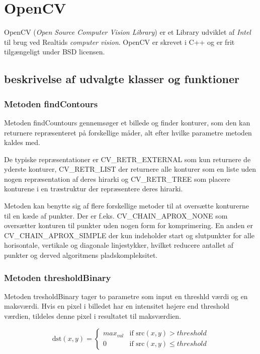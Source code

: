 \section{OpenCV}
OpenCV (\emph{Open Source Computer Vision Library}) er et Library udviklet af \emph{Intel}
til brug ved Realtids \emph{computer vision}.
OpenCV er skrevet i C++ og er frit tilgængeligt under BSD licensen.

\subsection{beskrivelse af udvalgte klasser og funktioner}

\subsubsection{Metoden findContours}
Metoden findCountours gennemsøger et billede og finder konturer, som den kan returnere 
repræsenteret på forskellige måder, alt efter hvilke parametre metoden kaldes med.

De typiske repræsentationer er CV\_RETR\_EXTERNAL som kun returnere de yderste konturer,
CV\_RETR\_LIST der returnere alle konturer som en liste uden nogen repræsentation af deres hirarki og
CV\_RETR\_TREE som placere konturene i en træstruktur der repræsentere deres hirarki.

Metoden kan benytte sig af flere forskellige metoder til at oversætte konturerne til en kæde af punkter. 
Der er f.eks. CV\_CHAIN\_APROX\_NONE som oversætter konturen til punkter uden nogen form for komprimering.
En anden er CV\_CHAIN\_APROX\_SIMPLE der kun indeholder start og slutpunkter for alle horisontale,
vertikale og diagonale linjestykker, hvilket reducere antallet af punkter og derved algoritmens
pladskompleksitet.
\cite{EmguCVLibDoc}

\subsubsection{Metoden thresholdBinary}
Metoden tresholdBinary tager to parametre som input en threshld værdi og en maksværdi.
Hvis en pixel i billedet har en intensitet højere end threshold værdien, tildeles denne pixel i resultatet til maksværdien.\cite{EmguCVLibDoc}

$$\text{dst}(x,y) = 
\begin{cases} 
max_{val} & \text{if src}(x,y) > threshold \\
0 & \text{if src}(x,y) \leq threshold
\end{cases}
$$

